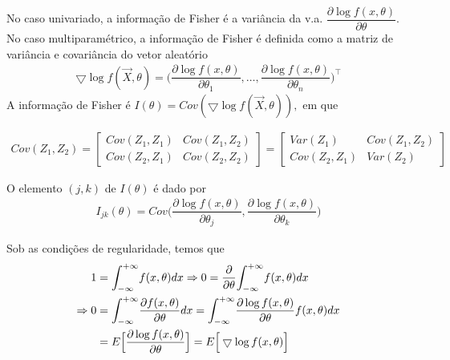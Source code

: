 \documentclass[12pt]{beamer}
\begin{document}
\begin{frame}{}
\begin{block}{}
\justifying
No caso univariado, a informação de Fisher é a variância da v.a. $\dfrac{\partial\log{f(x,\theta)}}{\partial\theta}.$ No caso multiparamétrico, a informação de Fisher é definida como a matriz de variância e covariância do vetor aleatório
\begin{align*}
\bigtriangledown\log{f(\Vec{X},\theta)}=\Big(\dfrac{\partial\log{f(x,\theta)}}{\partial\theta_{1}},\ldots,\dfrac{\partial\log{f(x,\theta)}}{\partial\theta_{n}}\Big)^\top
\end{align*}
A informação de Fisher é $I(\theta)=Cov(\bigtriangledown\log{f(\Vec{X},\theta)}),$ em que 
\vspace{1cm}

{\small
\begin{align*}
Cov(Z_{1},Z_{2})=\begin{bmatrix}
       Cov(Z_{1},Z_{1}) & Cov(Z_{1},Z_{2})\\[0.3em]
       Cov(Z_{2},Z_{1}) & Cov(Z_{2},Z_{2})
\end{bmatrix}=\begin{bmatrix}
       Var(Z_{1})      & Cov(Z_{1},Z_{2})\\[0.3em]
       Cov(Z_{2},Z_{1})& Var(Z_{2})
\end{bmatrix}
\end{align*}
}

\end{block}
\end{frame}

\begin{frame}{}
\begin{block}{}
\justifying
O elemento $(j,k)$ de $I(\theta)$ é dado por 
\begin{align*}
    I_{jk}(\theta)=Cov\Big(\dfrac{\partial\log{f(x,\theta)}}{\partial\theta_{j}},\dfrac{\partial\log{f(x,\theta)}}{\partial\theta_{k}}\Big)
\end{align*}
\end{block}
\pause
\begin{block}{}
\justifying
Sob as condições de regularidade, temos que
\begin{align*}
    1&={\displaystyle \int_{-\infty}^{+\infty}} f(x,\theta)dx\Rightarrow 0=\dfrac{\partial}{\partial\theta}{\displaystyle \int_{-\infty}^{+\infty}} f(x,\theta)dx\\
    \Rightarrow 0&={\displaystyle \int_{-\infty}^{+\infty}}\dfrac{\partial f(x,\theta)}{\partial\theta} dx={\displaystyle \int_{-\infty}^{+\infty}}\dfrac{\partial \log{f(x,\theta)}}{\partial\theta}f(x,\theta)dx\\
    &=E\Big[\dfrac{\partial \log{f(x,\theta)}}{\partial\theta}\Big]=E\Big[\bigtriangledown\log{f(x,\theta)}\Big]
\end{align*}
\end{block}
\end{frame}
\end{document}

